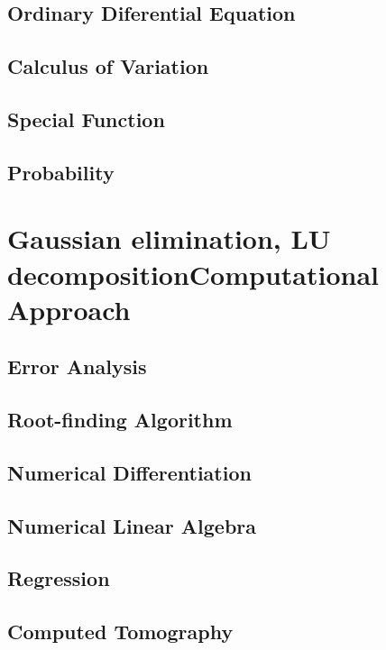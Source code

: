 \documentclass[10pt]{report}
\begin{document}
\section{Ordinary Diferential Equation}

\clearpage

\clearpage

\clearpage

\clearpage

\section{Calculus of Variation}

\clearpage

\clearpage

\section{Special Function}

\clearpage

\section{Probability}

\clearpage

\chapter{Gaussian elimination, LU decompositionComputational Approach}
\clearpage
\section{Error Analysis}

\clearpage

\section{Root-finding Algorithm}

\clearpage

\section{Numerical Differentiation}

\clearpage

\section{Numerical Linear Algebra}

\clearpage

\section{Regression}

\clearpage

\section{Computed Tomography}

\printbibliography
\end{document}
